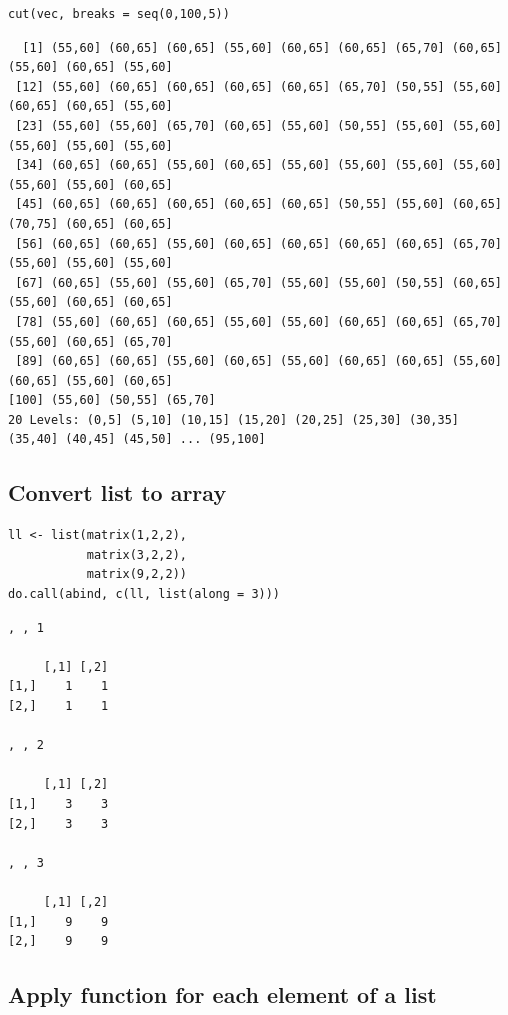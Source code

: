 \documentclass{article}
\begin{document}
\lstset{language=r,label= ,caption= ,captionpos=b,numbers=none}
\begin{lstlisting}
cut(vec, breaks = seq(0,100,5))
\end{lstlisting}

\begin{verbatim}
  [1] (55,60] (60,65] (60,65] (55,60] (60,65] (60,65] (65,70] (60,65] (55,60] (60,65] (55,60]
 [12] (55,60] (60,65] (60,65] (60,65] (60,65] (65,70] (50,55] (55,60] (60,65] (60,65] (55,60]
 [23] (55,60] (55,60] (65,70] (60,65] (55,60] (50,55] (55,60] (55,60] (55,60] (55,60] (55,60]
 [34] (60,65] (60,65] (55,60] (60,65] (55,60] (55,60] (55,60] (55,60] (55,60] (55,60] (60,65]
 [45] (60,65] (60,65] (60,65] (60,65] (60,65] (50,55] (55,60] (60,65] (70,75] (60,65] (60,65]
 [56] (60,65] (60,65] (55,60] (60,65] (60,65] (60,65] (60,65] (65,70] (55,60] (55,60] (55,60]
 [67] (60,65] (55,60] (55,60] (65,70] (55,60] (55,60] (50,55] (60,65] (55,60] (60,65] (60,65]
 [78] (55,60] (60,65] (60,65] (55,60] (55,60] (60,65] (60,65] (65,70] (55,60] (60,65] (65,70]
 [89] (60,65] (60,65] (55,60] (60,65] (55,60] (60,65] (60,65] (55,60] (60,65] (55,60] (60,65]
[100] (55,60] (50,55] (65,70]
20 Levels: (0,5] (5,10] (10,15] (15,20] (20,25] (25,30] (30,35] (35,40] (40,45] (45,50] ... (95,100]
\end{verbatim}

\subsection{Convert list to array}
\label{sec:org18d01b1}

\lstset{language=r,label= ,caption= ,captionpos=b,numbers=none}
\begin{lstlisting}
ll <- list(matrix(1,2,2),
		   matrix(3,2,2),
		   matrix(9,2,2))
do.call(abind, c(ll, list(along = 3)))
\end{lstlisting}

\begin{verbatim}
, , 1

     [,1] [,2]
[1,]    1    1
[2,]    1    1

, , 2

     [,1] [,2]
[1,]    3    3
[2,]    3    3

, , 3

     [,1] [,2]
[1,]    9    9
[2,]    9    9
\end{verbatim}

\subsection{Apply function for each element of a list}
\label{sec:org025ae2e}
\end{document}
